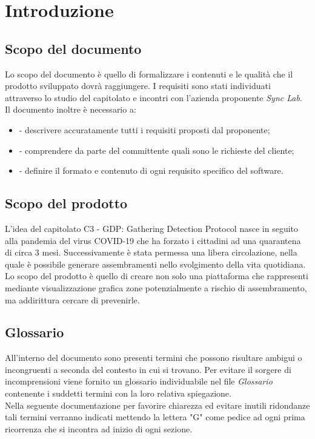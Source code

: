 \chapter{Introduzione}

\section{Scopo del documento}
Lo scopo del documento è quello di formalizzare i contenuti e le qualità che il prodotto sviluppato dovrà raggiungere. 
I requisiti sono stati individuati attraverso lo studio del capitolato e incontri con l'azienda proponente \emph{Sync Lab}. 
Il documento inoltre è necessario a:
\begin{itemize}
	\item - descrivere accuratamente tutti i requisiti proposti dal proponente;
	\item - comprendere da parte del committente quali sono le richieste del cliente;
	\item - definire il formato e contenuto di ogni requisito specifico del software.
\end{itemize} 
\section{Scopo del prodotto}
L'idea del capitolato C3 - GDP: Gathering Detection Protocol nasce in seguito alla pandemia del virus COVID-19 che ha forzato i cittadini ad una quarantena di circa 3 mesi. Successivamente è stata permessa una libera circolazione, nella quale è possibile generare assembramenti nello svolgimento della vita quotidiana. Lo scopo del prodotto è quello di creare non solo una piattaforma che rappresenti mediante visualizzazione grafica zone potenzialmente a rischio di assembramento, ma addirittura cercare di prevenirle.  
\section{Glossario}
All'interno del documento sono presenti termini che possono risultare ambigui o incongruenti a seconda del contesto in cui si trovano. Per evitare il sorgere di incomprensioni viene fornito un glossario individuabile nel file \textit{Glossario} contenente i suddetti termini con la loro relativa spiegazione.
\\Nella seguente documentazione per favorire chiarezza ed evitare inutili ridondanze tali termini verranno indicati mettendo la lettera "G" come pedice ad ogni prima ricorrenza che si incontra ad inizio di ogni sezione.

